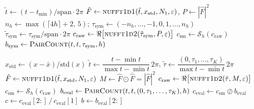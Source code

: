 \documentclass[twocolumn,10pt]{article}
\begin{document}
\begin{algorithm*}
	\small
	\caption{ACF scale at lag $0$ (Pearson normalization) --- \textsc{AcfScaleAtLag0}}
	\label{alg:acf-scale0}
	$\tilde t \gets (t-t_{\min})/\mathrm{span}\cdot 2\pi$\;
	$\hat F \gets \textsc{nufft1d1}(\tilde t, x_{\mathrm{std}}, N_1, \varepsilon)$, \quad $P \gets |\hat F|^2$\;
	$n_h \gets \max(\lceil 4h\rceil+2,\,5)$; \quad $\tau_{\mathrm{sym}} \gets (-n_h,\dots,-1,0,1,\dots,n_h)$ 
	$\tilde\tau_{\mathrm{sym}} \gets \tau_{\mathrm{sym}}/\mathrm{span}\cdot 2\pi$\;
	$c_{\mathrm{raw}} \gets \Re\big[\textsc{nufft1d2}(\tilde\tau_{\mathrm{sym}}, P,\varepsilon)\big]$\;
	$c_{\mathrm{sm}} \gets \mathcal{S}_h(c_{\mathrm{raw}})$ 
	$b_{\mathrm{sym}} \gets \textsc{PairCount}(t,t,\tau_{\mathrm{sym}},h)$ 
\end{algorithm*}


\begin{algorithm*}
	\small
	\caption{ACF via NUFFT + smoothing (Gaussian or rectangle)}
	\label{alg:acf-nufft}
	$x_{\mathrm{std}} \gets (x-\bar x)/\mathrm{std}(x)$\;
	$\tilde t \gets \dfrac{t-\min t}{\max t-\min t}\,2\pi$, \quad
	$\tilde\tau \gets \dfrac{(0,\tau_1,\dots,\tau_K)}{\max t-\min t}\,2\pi$\;
	$\hat F \gets \textsc{nufft1d1}(\tilde t, x_{\mathrm{std}}, N_1,\varepsilon)$\;
	$M \gets \hat F \odot \overline{\hat F} = |\hat F|^2$ 
	$c_{\mathrm{raw}} \gets \Re\big[\textsc{nufft1d2}(\tilde\tau, M,\varepsilon)\big]$\;
	$c_{\mathrm{sm}} \gets \mathcal{S}_h(c_{\mathrm{raw}})$\;
	$b_{\mathrm{eval}} \gets \textsc{PairCount}(t,t,(0,\tau_1,\dots,\tau_K),h)$ 
	$c_{\mathrm{eval}} \gets c_{\mathrm{sm}} \oslash b_{\mathrm{eval}}$\;
	$c \gets c_{\mathrm{eval}}[2{:}] \,/\, c_{\mathrm{eval}}[1]$ 
	$b \gets b_{\mathrm{eval}}[2{:}]$\;
\end{algorithm*}
%
\end{document}
